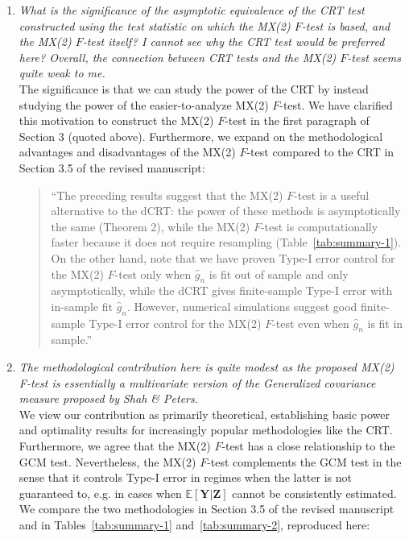 \documentclass[12pt]{article}
\begin{document}
\begin{enumerate}
	\item \textsl{What is the significance of the asymptotic equivalence of the CRT test constructed using the test statistic on which the MX(2) $F$-test is based, and the MX(2) $F$-test itself? I cannot see why the CRT test would be preferred here? Overall, the connection between CRT tests and the MX(2) $F$-test seems quite weak to me.} \\
	
	The significance is that we can study the power of the CRT by instead studying the power of the easier-to-analyze MX(2) $F$-test. We have clarified this motivation to construct the MX(2) $F$-test in the first paragraph of Section 3 (quoted above). Furthermore, we expand on the methodological advantages and disadvantages of the MX(2) $F$-test compared to the CRT in Section 3.5 of the revised manuscript:
	\begin{quote}
		``The preceding results suggest that the MX(2) $F$-test is a useful alternative to the dCRT: the power of these methods is asymptotically the same (Theorem 2), while the MX(2) $F$-test is computationally faster because it does not require resampling (Table~\ref{tab:summary-1}). On the other hand, note that we have proven Type-I error control for the MX(2) $F$-test only when $\widehat g_n$ is fit out of sample and only asymptotically, while the dCRT gives finite-sample Type-I error with in-sample fit $\widehat g_n$. However, numerical simulations suggest good finite-sample Type-I error control for the MX(2) $F$-test even when $\widehat g_n$ is fit in sample.''
	\end{quote}
	
	\item \textsl{The methodological contribution here is quite modest as the proposed MX(2) F-test is essentially a multivariate version of the Generalized covariance measure proposed by Shah \& Peters.}
\\

We view our contribution as primarily theoretical, establishing basic power and optimality results for increasingly popular methodologies like the CRT. Furthermore, we agree that the MX(2) $F$-test has a close relationship to the GCM test. Nevertheless, the MX(2) $F$-test complements the GCM test in the sense that it controls Type-I error in regimes when the latter is not guaranteed to, e.g. in cases when $\mathbb E[\bm Y | \bm Z]$ cannot be consistently estimated. We compare the two methodologies in Section 3.5 of the revised manuscript and in Tables~\ref{tab:summary-1} and~\ref{tab:summary-2}, reproduced here:


\end{enumerate}
\end{document}
